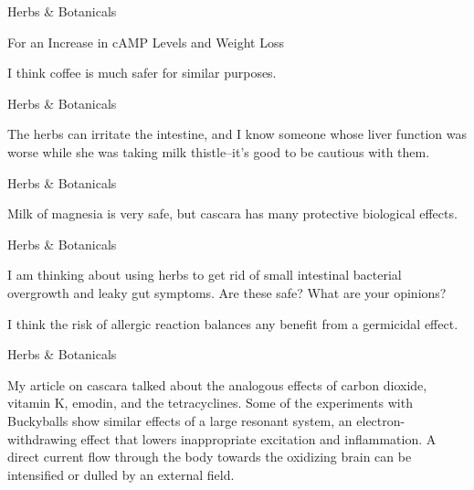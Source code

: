 \documentclass[11pt,oneside,openany,extrafontsizes]{memoir}
\begin{document}
\begin{standalonequote}{Herbs \& Botanicals}
    \begin{note}
        For an Increase in cAMP Levels and Weight Loss
    \end{note}

    \begin{answer}
        I think coffee is much safer for similar purposes.
    \end{answer}
\end{standalonequote}

\begin{standalonequote}{Herbs \& Botanicals}

    \begin{answer}
        The herbs can irritate the intestine, and I know someone whose liver function was worse while she was taking milk thistle--it's good to be cautious with them.
    \end{answer}
\end{standalonequote}

\begin{standalonequote}{Herbs \& Botanicals}

    \begin{answer}
        Milk of magnesia is very safe, but cascara has many protective biological effects.
    \end{answer}
\end{standalonequote}

\begin{qaexchange}{Herbs \& Botanicals}

    \begin{question}
        I am thinking about using herbs to get rid of small intestinal bacterial overgrowth and leaky gut symptoms. Are these safe? What are your opinions? 
    \end{question}

    \begin{answer}
      I think the risk of allergic reaction balances any benefit from a germicidal effect. 
    \end{answer}
\end{qaexchange}

\begin{standalonequote}{Herbs \& Botanicals}

    \begin{answer}
      My article on cascara talked about the analogous effects of carbon dioxide, vitamin K, emodin, and the tetracyclines. Some of the experiments with Buckyballs show similar effects of a large resonant system, an electron-withdrawing effect that lowers inappropriate excitation and inflammation. A direct current flow through the body towards the oxidizing brain can be intensified or dulled by an external field.
    \end{answer}
\end{standalonequote}
\end{document}
